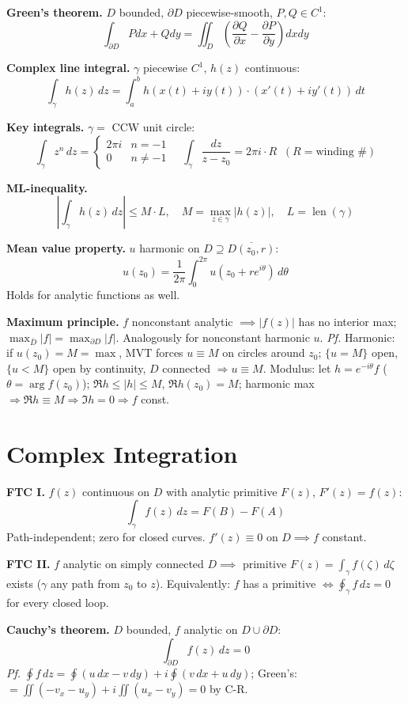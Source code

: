 \documentclass[9pt,twocolumn]{extarticle}
\begin{document}
\textbf{Green's theorem.} $D$ bounded, $\partial D$ piecewise-smooth, $P,Q\in C^1$:
$$\int_{\partial D}Pdx+Qdy=\iint_D\!\left(\frac{\partial Q}{\partial x}-\frac{\partial P}{\partial y}\right)dxdy$$

\textbf{Complex line integral.} $\gamma$ piecewise $C^1$, $h(z)$ continuous:
$$\int_\gamma h(z)\,dz=\int_a^b h(x(t)+iy(t))\cdot(x'(t)+iy'(t))\,dt$$

\textbf{Key integrals.} $\gamma=$ CCW unit circle:
$$\int_\gamma z^n\,dz=\begin{cases}2\pi i&n=-1\\0&n\ne-1\end{cases}
\quad
\int_\gamma\frac{dz}{z-z_0}=2\pi i\cdot R\;\;(R=\text{winding \#})$$

\textbf{ML-inequality.}
$$\left|\int_\gamma h(z)\,dz\right|\le M\cdot L,\quad
M=\max_{z\in\gamma}|h(z)|,\quad L=\operatorname{len}(\gamma)$$

\textbf{Mean value property.} $u$ harmonic on $D\supseteq\overline{D(z_0,r)}$:
$$u(z_0)=\frac{1}{2\pi}\int_0^{2\pi}u(z_0+re^{i\theta})\,d\theta$$
Holds for analytic functions as well.

\textbf{Maximum principle.}
$f$ nonconstant analytic $\implies|f(z)|$ has no interior max;\;
$\max_{\bar{D}}|f|=\max_{\partial D}|f|$. Analogously for nonconstant harmonic $u$.\;
\textit{Pf.} Harmonic: if $u(z_0)=M=\max$, MVT forces $u\equiv M$ on circles around $z_0$;\; $\{u=M\}$ open, $\{u<M\}$ open by continuity, $D$ connected $\Rightarrow u\equiv M$.\; Modulus: let $h=e^{-i\theta}f$ ($\theta=\arg f(z_0)$); $\Re h\le|h|\le M$, $\Re h(z_0)=M$;\; harmonic max $\Rightarrow\Re h\equiv M\Rightarrow\Im h=0\Rightarrow f$ const.

\section{Complex Integration}

\textbf{FTC I.} $f(z)$ continuous on $D$ with analytic primitive $F(z)$, $F'(z)=f(z)$:
$$\int_\gamma f(z)\,dz=F(B)-F(A)$$
Path-independent; zero for closed curves.\; $f'(z)\equiv0$ on $D\implies f$ constant.

\textbf{FTC II.} $f$ analytic on simply connected $D\implies$ primitive $F(z)=\int_\gamma f(\zeta)\,d\zeta$
exists ($\gamma$ any path from $z_0$ to $z$).\; Equivalently: $f$ has a primitive $\iff\oint_\gamma f\,dz=0$
for every closed loop.

\textbf{Cauchy's theorem.} $D$ bounded, $f$ analytic on $D\cup\partial D$:
$$\int_{\partial D}f(z)\,dz=0$$
\textit{Pf.} $\oint f\,dz=\oint(u\,dx{-}v\,dy)+i\oint(v\,dx{+}u\,dy)$;\; Green's: $=\iint({-}v_x{-}u_y)+i\iint(u_x{-}v_y)=0$ by C-R.
\end{document}
